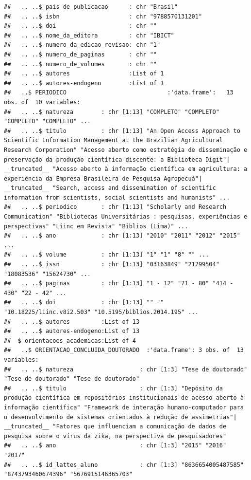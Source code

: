 \documentclass[]{article}
\begin{document}
\begin{verbatim}
##   .. ..$ pais_de_publicacao      : chr "Brasil"
##   .. ..$ isbn                    : chr "9788570131201"
##   .. ..$ doi                     : chr ""
##   .. ..$ nome_da_editora         : chr "IBICT"
##   .. ..$ numero_da_edicao_revisao: chr "1"
##   .. ..$ numero_de_paginas       : chr ""
##   .. ..$ numero_de_volumes       : chr ""
##   .. ..$ autores                 :List of 1
##   .. ..$ autores-endogeno        :List of 1
##   ..$ PERIODICO                             :'data.frame':   13 obs. of  10 variables:
##   .. ..$ natureza        : chr [1:13] "COMPLETO" "COMPLETO" "COMPLETO" "COMPLETO" ...
##   .. ..$ titulo          : chr [1:13] "An Open Access Approach to Scientific Information Management at the Brazilian Agricultural Research Corporation" "Acesso aberto como estratégia de disseminação e preservação da produção científica discente: a Biblioteca Digit"| __truncated__ "Acesso aberto à informação científica em agricultura: a experiência da Empresa Brasileira de Pesquisa Agropecuá"| __truncated__ "Search, access and dissemination of scientific information from scientists, social scientists and humanists" ...
##   .. ..$ periodico       : chr [1:13] "Scholarly and Research Communication" "Bibliotecas Universitárias : pesquisas, experiências e perspectivas" "Liinc em Revista" "Biblios (Lima)" ...
##   .. ..$ ano             : chr [1:13] "2010" "2011" "2012" "2015" ...
##   .. ..$ volume          : chr [1:13] "1" "1" "8" "" ...
##   .. ..$ issn            : chr [1:13] "03163849" "21799504" "18083536" "15624730" ...
##   .. ..$ paginas         : chr [1:13] "1 - 12" "71 - 80" "414 - 430" "22 - 42" ...
##   .. ..$ doi             : chr [1:13] "" "" "10.18225/liinc.v8i2.503" "10.5195/biblios.2014.195" ...
##   .. ..$ autores         :List of 13
##   .. ..$ autores-endogeno:List of 13
##  $ orientacoes_academicas:List of 4
##   ..$ ORIENTACAO_CONCLUIDA_DOUTORADO  :'data.frame': 3 obs. of  13 variables:
##   .. ..$ natureza                   : chr [1:3] "Tese de doutorado" "Tese de doutorado" "Tese de doutorado"
##   .. ..$ titulo                     : chr [1:3] "Depósito da produção científica em repositórios institucionais de acesso aberto à informação científica" "Framework de interação humano-computador para o desenvolvimento de sistemas orientados à redução de assimetrias"| __truncated__ "Fatores que influenciam a comunicação de dados de pesquisa sobre o vírus da zika, na perspectiva de pesquisadores"
##   .. ..$ ano                        : chr [1:3] "2015" "2016" "2017"
##   .. ..$ id_lattes_aluno            : chr [1:3] "8636654005487585" "8743793460674396" "5676915146365703"

\end{verbatim}
\end{document}
